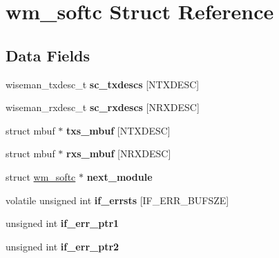 \hypertarget{structwm__softc}{}\section{wm\+\_\+softc Struct Reference}
\label{structwm__softc}
\subsection*{Data Fields}
\begin{DoxyCompactItemize}
\item 
\mbox{\label{structwm__softc_a70bceea56d557a6c19186ff7c0592e94}} 
wiseman\+\_\+txdesc\+\_\+t {\bfseries sc\+\_\+txdescs} \mbox{[}N\+T\+X\+D\+E\+SC\mbox{]}
\item 
\mbox{\label{structwm__softc_add56a9f4fbcf6e4d77aa29917103a8b7}} 
wiseman\+\_\+rxdesc\+\_\+t {\bfseries sc\+\_\+rxdescs} \mbox{[}N\+R\+X\+D\+E\+SC\mbox{]}
\item 
\mbox{\label{structwm__softc_ad74c4fa142f0c796d4369f63562eff33}} 
struct mbuf $\ast$ {\bfseries txs\+\_\+mbuf} \mbox{[}N\+T\+X\+D\+E\+SC\mbox{]}
\item 
\mbox{\label{structwm__softc_a0d995194aa5f3b9190f1f95543840d54}} 
struct mbuf $\ast$ {\bfseries rxs\+\_\+mbuf} \mbox{[}N\+R\+X\+D\+E\+SC\mbox{]}
\item 
\mbox{\label{structwm__softc_ab142842f5010e651f349de6cdd24a65c}} 
struct \mbox{\hyperlink{structwm__softc}{wm\+\_\+softc}} $\ast$ {\bfseries next\+\_\+module}
\item 
\mbox{\label{structwm__softc_a474e2b803f542b9d60ae030c78f0761e}} 
volatile unsigned int {\bfseries if\+\_\+errsts} \mbox{[}I\+F\+\_\+\+E\+R\+R\+\_\+\+B\+U\+F\+S\+ZE\mbox{]}
\item 
\mbox{\label{structwm__softc_a9573f3c4a1c5190561aa5b36b2465096}} 
unsigned int {\bfseries if\+\_\+err\+\_\+ptr1}
\item 
\mbox{\label{structwm__softc_aefa6a939e181317d558426e855e6241d}} 
unsigned int {\bfseries if\+\_\+err\+\_\+ptr2}
\item 

\end{DoxyCompactItemize}
